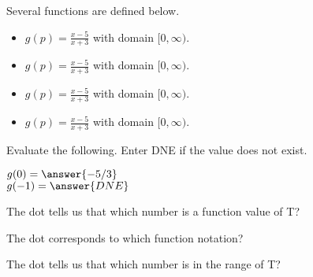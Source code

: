 \documentclass{ximera}
\begin{document}
\begin{definition}
Several functions are defined below.
\begin{itemize}
\item $g(p) = \frac{x-5}{x+3}$ with domain $[0, \infty)$. \\ \quad
\item $g(p) = \frac{x-5}{x+3}$ with domain $[0, \infty)$. 
\item $g(p) = \frac{x-5}{x+3}$ with domain $[0, \infty)$. 
\item $g(p) = \frac{x-5}{x+3}$ with domain $[0, \infty)$. 
\end{itemize}
\end{definition}



\begin{exercise}
Evaluate the following.  Enter DNE if the value does not exist.

$g(0) = \answer{-5/3}$  \\
$g(-1) = \answer{DNE}$


\end{exercise}






\begin{exercise}
The dot tells us that which number is a function value of T?

\begin{selectAll}
\end{selectAll}

\end{exercise}




\begin{exercise}
The dot corresponds to which function notation? 

\begin{selectAll}
\end{selectAll}

\end{exercise}





\begin{exercise}
The dot tells us that which number is in the range of T?

\begin{selectAll}
\end{selectAll}

\end{exercise}
\end{document}
